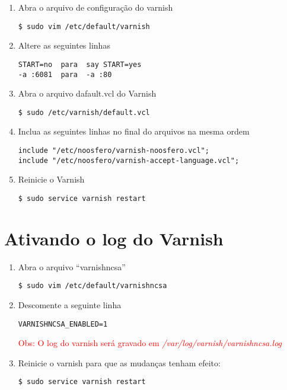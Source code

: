 \begin{enumerate}[label=\alph*)]
\item Abra o arquivo de configuração do varnish
\begin{lstlisting}
$ sudo vim /etc/default/varnish
\end{lstlisting}

\item Altere as seguintes linhas
\begin{lstlisting}
START=no  para  say START=yes
-a :6081  para  -a :80
\end{lstlisting}

\item Abra o arquivo dafault.vcl do Varnish
\begin{lstlisting}
$ sudo /etc/varnish/default.vcl
\end{lstlisting}

\item Inclua as seguintes linhas no final do arquivos na mesma ordem
\begin{lstlisting}
include "/etc/noosfero/varnish-noosfero.vcl";
include "/etc/noosfero/varnish-accept-language.vcl";
\end{lstlisting}

\item Reinicie o Varnish
\begin{lstlisting}
$ sudo service varnish restart
\end{lstlisting}

\end{enumerate}
\section{Ativando o log do Varnish}

\begin{enumerate}[label=\alph*)]
\item Abra o arquivo “varnishncsa”
\begin{lstlisting}
$ sudo vim /etc/default/varnishncsa
\end{lstlisting}

\item Descomente a seguinte linha
\begin{lstlisting}
VARNISHNCSA_ENABLED=1
\end{lstlisting}

\textcolor{red}{{\scriptsize Obs: O log do varnish será gravado em \emph{/var/log/varnish/varnishncsa.log}}}

\item Reinicie o varnish para que as mudanças tenham efeito:
\begin{lstlisting}
$ sudo service varnish restart
\end{lstlisting}
\end{enumerate}
